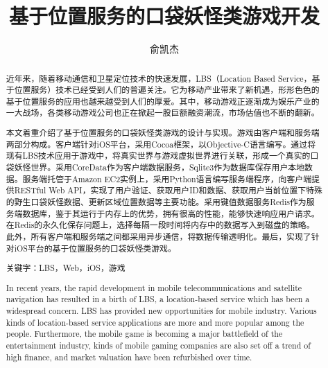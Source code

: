 \documentclass{article}
\title{基于位置服务的口袋妖怪类游戏开发}
\author{俞凯杰}
\begin{document}
\begin{CJK}{UTF8}{gbsn}
  \maketitle

  \renewcommand{\abstractname}{摘要}
	\renewcommand{\figurename}{图}
	\renewcommand{\refname}{参考文献}

	

  \begin{abstract}
    近年来，随着移动通信和卫星定位技术的快速发展，LBS（Location Based Service，基于位置服务）技术已经受到人们的普遍关注。它为移动产业带来了新机遇，形形色色的基于位置服务的应用也越来越受到人们的厚爱。其中，移动游戏正逐渐成为娱乐产业的一大战场，各类移动游戏公司也正在掀起一股巨额融资潮流，市场估值也不断的翻新。

    本文着重介绍了基于位置服务的口袋妖怪类游戏的设计与实现。游戏由客户端和服务端两部分构成。客户端针对iOS平台，采用Cocoa框架，以Objective-C语言编写。通过将现有LBS技术应用于游戏中，将真实世界与游戏虚拟世界进行关联，形成一个真实的口袋妖怪世界。采用CoreData作为客户端数据服务，Sqlite3作为数据库保存用户本地数据。服务端托管于Amazon EC2实例上，采用Python语言编写服务端程序，向客户端提供RESTful Web API，实现了用户验证、获取用户ID和数据、获取用户当前位置下特殊的野生口袋妖怪数据、更新区域位置数据等主要功能。采用键值数据服务Redis作为服务端数据库，鉴于其运行于内存上的优势，拥有很高的性能，能够快速响应用户请求。在Redis的永久化保存问题上，选择每隔一段时间将内存中的数据写入到磁盘的策略。此外，所有客户端和服务端之间都采用异步通信，将数据传输透明化。最后，实现了针对iOS平台的基于位置服务的口袋妖怪类游戏。

    关键字：LBS，Web，iOS，游戏
    
  \end{abstract}

  \begin{abstract}
    In recent years, the rapid development in mobile telecommunications and satellite navigation has resulted in a birth of LBS, a location-based service which has been a widespread concern. LBS has provided new opportunities for mobile industry. Various kinds of location-based service applications are more and more popular among the people. Furthermore, the mobile game is becoming a major battlefield of the entertainment industry, kinds of mobile gaming companies are also set off a trend of high finance, and market valuation have been refurbished over time.


\end{abstract}
\end{CJK}
\end{document}
